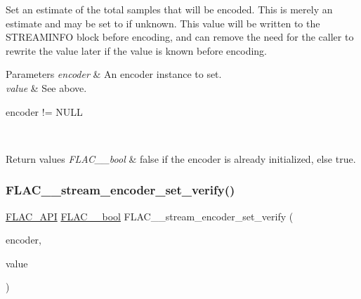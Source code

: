 Set an estimate of the total samples that will be encoded. This is merely an estimate and may be set to {} if unknown. This value will be written to the S\+T\+R\+E\+A\+M\+I\+N\+FO block before encoding, and can remove the need for the caller to rewrite the value later if the value is known before encoding.

{} 
\begin{DoxyParams}{Parameters}
{\em encoder} & An encoder instance to set. \\
\hline
{\em value} & See above.  
\begin{DoxyCode}
encoder != NULL 
\end{DoxyCode}
 \\
\hline
\end{DoxyParams}

\begin{DoxyRetVals}{Return values}
{\em F\+L\+A\+C\+\_\+\+\_\+bool} & {\ttfamily false} if the encoder is already initialized, else {\ttfamily true}. \\
\hline
\end{DoxyRetVals}
\mbox{\label{group__flac__stream__encoder_ga5f4ac18a7207d2864fed72d284486f9e}} 
\subsubsection{\texorpdfstring{F\+L\+A\+C\+\_\+\+\_\+stream\+\_\+encoder\+\_\+set\+\_\+verify()}{FLAC\_\_stream\_encoder\_set\_verify()}}
{\footnotesize\ttfamily \hyperlink{group__flac__export_ga56ca07df8a23310707732b1c0007d6f5}{F\+L\+A\+C\+\_\+\+A\+PI} \hyperlink{ordinals_8h_a95103469f1cbd78b8cf250194985b34e}{F\+L\+A\+C\+\_\+\+\_\+bool} F\+L\+A\+C\+\_\+\+\_\+stream\+\_\+encoder\+\_\+set\+\_\+verify (\begin{DoxyParamCaption}\item[{\hyperlink{struct_f_l_a_c_____stream_encoder}{F\+L\+A\+C\+\_\+\+\_\+\+Stream\+Encoder} $\ast$}]{encoder,  }\item[{\hyperlink{ordinals_8h_a95103469f1cbd78b8cf250194985b34e}{F\+L\+A\+C\+\_\+\+\_\+bool}}]{value }\end{DoxyParamCaption})}

